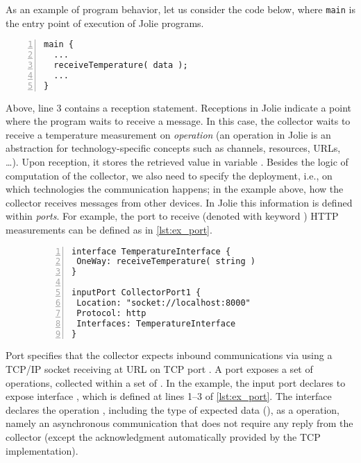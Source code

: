 As an example of program behavior, let us consider the code below, where
\lstinline{main} is the entry point of execution of Jolie programs.
%
\begin{lstlisting}[numbers=left,basicstyle=\footnotesize\ttfamily]
main {
  ...
  receiveTemperature( data );
  ...
}
\end{lstlisting}
%
Above, line 3 contains a reception statement. Receptions in Jolie indicate a
point where the program waits to receive a message. In this case, the collector
waits to receive a temperature measurement on \emph{operation}
 (an operation in Jolie is an abstraction for
technology-specific concepts such as channels, resources, URLs, \dots). Upon
reception, it stores the retrieved value in variable .
%
Besides the logic of computation of the collector, we also need to specify the
deployment, i.e., on which technologies the communication happens; in the
example above, how the collector receives messages from other devices. In Jolie
this information is defined within \emph{ports}. For example, the port to
receive (denoted with keyword ) HTTP measurements can be defined
as in \cref{lst:ex_port}.
%
\begin{figure}
 \begin{lstlisting}[numbers=left,basicstyle=\ttfamily\footnotesize,caption=Example of interface
and input port in Jolie.,label=lst:ex_port]
interface TemperatureInterface {
 OneWay: receiveTemperature( string )
}

inputPort CollectorPort1 {
 Location: "socket://localhost:8000"
 Protocol: http
 Interfaces: TemperatureInterface
}
\end{lstlisting}
\end{figure}
%
Port  specifies that the collector expects inbound
communications via   using a TCP/IP socket receiving
at URL  on TCP port . A port exposes a set of
operations, collected within a set of . In the example, the
input port  declares to expose interface
, which is defined at lines 1--3 of \cref{lst:ex_port}. The interface
declares the operation , including the type of expected
data (), as a  operation, namely an asynchronous
communication that does not require any reply from the collector (except the
acknowledgment automatically provided by the TCP implementation).

